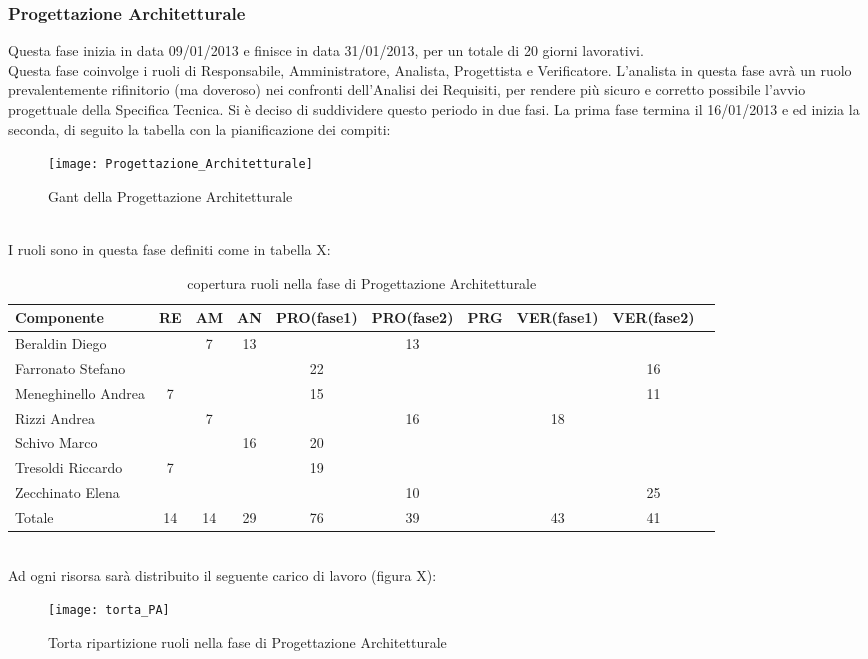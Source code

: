 \subsubsection{Progettazione Architetturale}
Questa fase inizia in data 09/01/2013 e finisce in data 31/01/2013, per un totale di 20 giorni lavorativi. \\
Questa fase coinvolge i ruoli di Responsabile, Amministratore, Analista, Progettista e Verificatore.
L'analista in questa fase avrà un ruolo prevalentemente rifinitorio (ma doveroso) nei confronti dell'Analisi dei Requisiti, per rendere più sicuro e corretto possibile l'avvio progettuale della Specifica Tecnica.
Si è deciso di suddividere questo periodo in due fasi. La prima fase termina il 16/01/2013 e ed inizia la seconda, di seguito la tabella con la pianificazione dei compiti:\\
\begin{figure}[h]
  \texttt{[image: Progettazione\_Architetturale]}
\caption{Gant della Progettazione Architetturale }
\end{figure}\\
I ruoli sono in questa fase definiti come in tabella X:\\
\begin{table}[h]
\centering
\begin{tabular}{|l|c|c|c|c|c|c|c|cl|}
\hline
Componente& RE& AM& AN& PRO(fase1)& PRO(fase2)& PRG& VER(fase1)& VER(fase2)& \\
\hline
Beraldin Diego & & 7& 13& & 13& & & &\\
Farronato Stefano & & & & 22& & & & 16&\\
Meneghinello Andrea & 7& & & 15& & & & 11&\\
Rizzi Andrea & & 7& & & 16& & 18& &\\
Schivo Marco & & & 16& 20& & & & &\\
Tresoldi Riccardo & 7& & & 19& & & & &\\
Zecchinato Elena & & & & & 10& & & 25&\\
\hline
Totale & 14& 14& 29& 76& 39& & 43& 41&\\
\hline
\end{tabular}
\caption{copertura ruoli nella fase di Progettazione Architetturale}
\end{table}\\
Ad ogni risorsa sarà distribuito il seguente carico di lavoro (figura X):\\
\begin{figure}[h]
  \texttt{[image: torta\_PA]}
\caption{Torta ripartizione ruoli nella fase di Progettazione Architetturale}
\end{figure}\\
